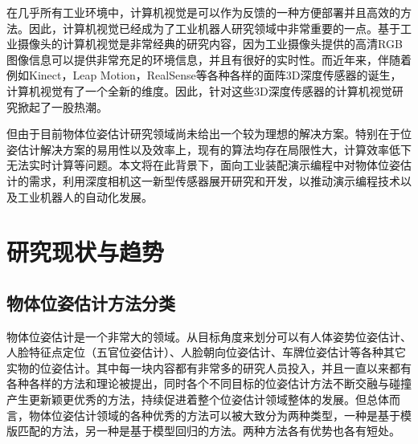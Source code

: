 在几乎所有工业环境中，计算机视觉是可以作为反馈的一种方便部署并且高效的方法。因此，计算机视觉已经成为了工业机器人研究领域中非常重要的一点。基于工业摄像头的计算机视觉是非常经典的研究内容，因为工业摄像头提供的高清RGB图像信息可以提供非常充足的环境信息，并且有很好的实时性。而近年来，伴随着例如Kinect，Leap Motion，RealSense等各种各样的面阵3D深度传感器的诞生，计算机视觉有了一个全新的维度。因此，针对这些3D深度传感器的计算机视觉研究掀起了一股热潮。

但由于目前物体位姿估计研究领域尚未给出一个较为理想的解决方案。特别在于位姿估计解决方案的易用性以及效率上，现有的算法均存在局限性大，计算效率低下无法实时计算等问题。本文将在此背景下，面向工业装配演示编程中对物体位姿估计的需求，利用深度相机这一新型传感器展开研究和开发，以推动演示编程技术以及工业机器人的自动化发展。


\section{研究现状与趋势} 

\subsection{物体位姿估计方法分类} %


物体位姿估计是一个非常大的领域。从目标角度来划分可以有人体姿势位姿估计、人脸特征点定位（五官位姿估计）、人脸朝向位姿估计、车牌位姿估计等各种其它实物的位姿估计。其中每一块内容都有非常多的研究人员投入，并且一直以来都有各种各样的方法和理论被提出，同时各个不同目标的位姿估计方法不断交融与碰撞产生更新颖更优秀的方法，持续促进着整个位姿估计领域整体的发展。但总体而言，物体位姿估计领域的各种优秀的方法可以被大致分为两种类型，一种是基于模版匹配的方法，另一种是基于模型回归的方法。两种方法各有优势也各有短处。

